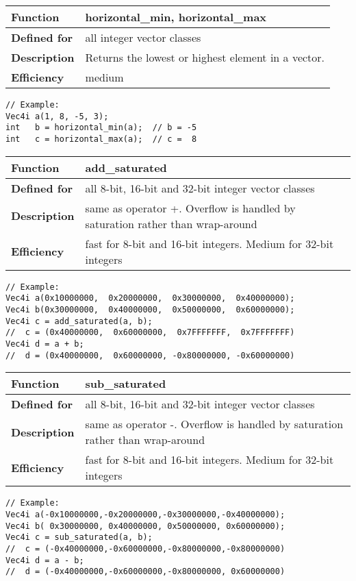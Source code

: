 \documentclass[vcl_manual.tex]{subfiles}
\begin{document}
\begin{tabular}{|p{25mm}|p{100mm}|}
\hline
\bfseries Function & horizontal\_min, horizontal\_max \\ \hline
\bfseries Defined for & all integer vector classes \\ \hline
\bfseries Description & Returns the lowest or highest element in a vector. \\ \hline
\bfseries Efficiency & medium \\ \hline
\end{tabular}
\begin{lstlisting}[frame=none]
// Example:
Vec4i a(1, 8, -5, 3);
int   b = horizontal_min(a);  // b = -5
int   c = horizontal_max(a);  // c =  8
\end{lstlisting}

\begin{tabular}{|p{25mm}|p{100mm}|}
\hline
\bfseries Function & add\_saturated\\ \hline
\bfseries Defined for & all 8-bit, 16-bit and 32-bit integer vector classes \\ \hline
\bfseries Description & same as operator +. Overflow is handled by saturation rather than wrap-around \\ \hline
\bfseries Efficiency & fast for 8-bit and 16-bit integers. Medium for 32-bit integers \\ \hline
\end{tabular}
\begin{lstlisting}[frame=none]
// Example:
Vec4i a(0x10000000,  0x20000000,  0x30000000,  0x40000000);
Vec4i b(0x30000000,  0x40000000,  0x50000000,  0x60000000);
Vec4i c = add_saturated(a, b);  
//  c = (0x40000000,  0x60000000,  0x7FFFFFFF,  0x7FFFFFFF)
Vec4i d = a + b;
//  d = (0x40000000,  0x60000000, -0x80000000, -0x60000000)
\end{lstlisting}


\begin{tabular}{|p{25mm}|p{100mm}|}
\hline
\bfseries Function & sub\_saturated\\ \hline
\bfseries Defined for & all 8-bit, 16-bit and 32-bit integer vector classes \\ \hline
\bfseries Description & same as operator -. Overflow is handled by saturation rather than wrap-around \\ \hline
\bfseries Efficiency & fast for 8-bit and 16-bit integers. Medium for 32-bit integers \\ \hline
\end{tabular}
\begin{lstlisting}[frame=none]
// Example:
Vec4i a(-0x10000000,-0x20000000,-0x30000000,-0x40000000);
Vec4i b( 0x30000000, 0x40000000, 0x50000000, 0x60000000);
Vec4i c = sub_saturated(a, b);  
//  c = (-0x40000000,-0x60000000,-0x80000000,-0x80000000)
Vec4i d = a - b;
//  d = (-0x40000000,-0x60000000,-0x80000000, 0x60000000)
\end{lstlisting}
\end{document}

